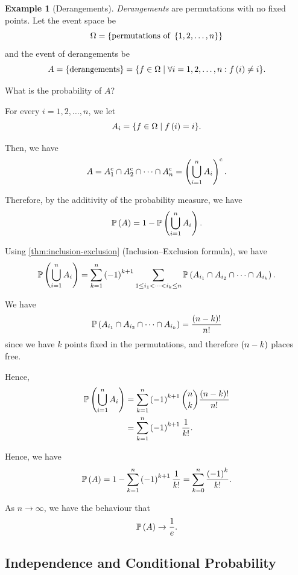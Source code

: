 \documentclass{article}
\theoremstyle{definition}
\newtheorem{example}[theorem]{Example}
\theoremstyle{remark}
\newcommand{\Prob}{\mathbb{P}}
\newcommand{\compl}{^{\mathrm{c}}}
\newcommand{\set}[2]{\{#1\mid #2\}}
\begin{document}
\begin{example}[Derangements]
    \label{ex:derangements}%
    \emph{Derangements} are permutations with no fixed points. Let the event space be
    \[
        \Omega = \left\{\text{permutations of }\left\{1, 2, \ldots, n\right\}\right\}
    \]
    and the event of derangements be
    \[
        A = \Bqty{\text{derangements}} = \set{f \in \Omega}{\forall i = 1, 2, \ldots, n: f\pqty{i} \neq i}.
    \]

    What is the probability of \(A\)?

    For every \(i = 1, 2, \ldots, n\), we let
    \[
        A_i = \set{f \in \Omega}{f\pqty{i} = i}.
    \]

    Then, we have
    \[
        A = A_1\compl \cap A_2\compl \cap \cdots \cap A_n\compl = \pqty{\bigcup_{i = 1}^{n} A_i} \compl.
    \]

    Therefore, by the additivity of the probability measure, we have
    \[
        \Prob\pqty{A} = 1 - \Prob\pqty{\bigcup_{i = 1}^{n} A_i}.
    \]

    Using \autoref{thm:inclusion-exclusion} (Inclusion--Exclusion formula), we have
    \[
        \Prob\pqty{\bigcup_{i = 1}^{n} A_i} = \sum_{k = 1}^{n} \pqty{-1}^{k + 1} \sum_{1 \leq i_1 < \cdots < i_k \leq n} \Prob\pqty{A_{i_1} \cap A_{i_2} \cap \cdots \cap A_{i_k}}.
    \]

    We have
    \[
        \Prob\pqty{A_{i_1} \cap A_{i_2} \cap \cdots \cap A_{i_k}} = \frac{\pqty{n - k}!}{n!}
    \]
    since we have \(k\) points fixed in the permutations, and therefore \(\left(n - k\right)\) places free.
    
    Hence,
    \begin{align*}
        \Prob\pqty{\bigcup_{i = 1}^{n} A_i} &= \sum_{k = 1}^{n} \pqty{-1}^{k + 1} \binom{n}{k} \frac{\pqty{n - k}!}{n!} \\
        &= \sum_{k = 1}^{n} \pqty{-1}^{k + 1} \frac{1}{k!}.
    \end{align*}

    Hence, we have
    \[
        \Prob\pqty{A} = 1 - \sum_{k = 1}^{n} \pqty{-1}^{k + 1} \frac{1}{k!} = \sum_{k = 0}^{n} \frac{\pqty{-1}^{k}}{k!}.
    \]

    As \(n \to \infty\), we have the behaviour that
    \[
        \Prob\pqty{A} \to \frac{1}{e}.
    \]
\end{example}

\subsection{Independence and Conditional Probability}
\end{document}
